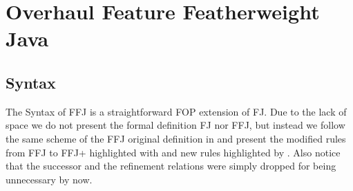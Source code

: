 \chapter{Overhaul Feature Featherweight Java}\label{chap:ffj}

\section{Syntax}
The Syntax of \gls{FFJ} is a straightforward \gls{FOP} extension of \gls{FJ}. Due to the lack
of space we do not present the formal definition \gls{FJ} nor \gls{FFJ}, but instead we follow
the same scheme of the \gls{FFJ} original definition in \cite{apel_feature_2008} and present
the modified rules from \gls{FFJ} to \gls{FFJ+} highlighted with  
and new rules highlighted by . Also notice that the successor and 
the refinement relations were simply dropped for being unnecessary by now.

\newcommand{\cdecl}[6]{\texttt{class #1 extends #2 \{\={#3} \={#4}; #5 \={#6}\}}}
\newcommand{\crefine}[6]{\texttt{refines class #1 \{\={#2} \={#3}; #4 \={#5} \={#6}\}}}
\newcommand{\mdecl}[5]{\texttt{#1 #2 (\={#3} \={#4}) \{return #5;\}}}
\newcommand{\mrefine}[5]{\texttt{refines #1 #2 (\={#3} \={#4}) \{return #5;\}}}

